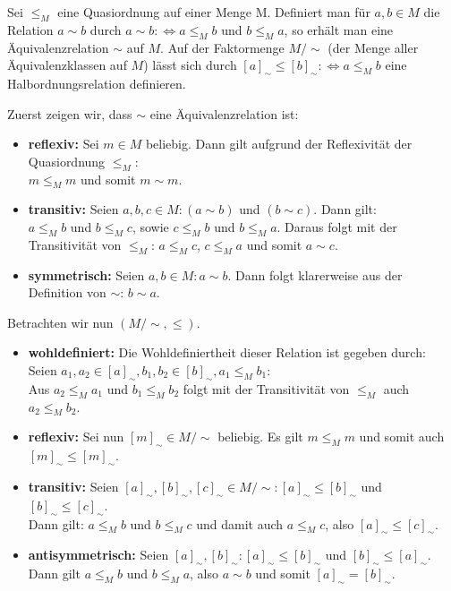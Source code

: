 \begin{exercise}
    Sei $\leq_M$ eine Quasiordnung auf einer Menge M. Definiert man für $a,b \in M$
    die Relation $a \sim b$ durch $a \sim b :\iff a \leq_M b$ und $ b \leq_M a$, so
    erhält man eine Äquivalenzrelation $\sim$ auf $M$. Auf der Faktormenge $M/\sim$
    (der Menge aller Äquivalenzklassen auf $M$) lässt sich durch $[a]_{\sim} \leq
    [b]_{\sim}: \iff a \leq_M b$ eine Halbordnungsrelation definieren.
\end{exercise}
\begin{solution}
Zuerst zeigen wir, dass $\sim$ eine Äquivalenzrelation ist: \\
\begin{itemize}
  \item \textbf{reflexiv:} Sei $m \in M$ beliebig. Dann gilt aufgrund der Reflexivität der Quasiordnung $\leq_M$: \\
  $m \leq_M m$ und somit $m \sim m$.
  \item \textbf{transitiv:} Seien $a,b,c \in M: (a \sim b)$ und $(b \sim c)$. Dann gilt: \\
  $a \leq_M b$ und $b \leq_M c$, sowie $c \leq_M b$ und $b \leq_M a$.
  Daraus folgt mit der Transitivität von $\leq_M$: $a \leq_M c$, $c \leq_M a$ und somit $a \sim c$.
  \item \textbf{symmetrisch:} Seien $a,b \in M: a \sim b$. Dann folgt klarerweise aus der Definition von $\sim$: $b \sim a$. \\
\end{itemize}
Betrachten wir nun $(M/\sim, \leq)$.
\begin{itemize}
  \item \textbf{wohldefiniert:}
  Die Wohldefiniertheit dieser Relation ist gegeben durch: \\
  Seien $a_1, a_2 \in [a]_{\sim}, b_1, b_2 \in [b]_{\sim}, a_1 \leq_M b_1$: \\
  Aus $a_2 \leq_M a_1$ und $b_1 \leq_M b_2$ folgt mit der Transitivität von $\leq_M$ auch $a_2 \leq_M b_2$.
  \item \textbf{reflexiv:} Sei nun $[m]_{\sim} \in M/\sim$ beliebig. Es gilt $m \leq_M m$ und somit auch $[m]_{\sim} \leq [m]_{\sim}$.
  \item \textbf{transitiv:} Seien $[a]_{\sim},[b]_{\sim},[c]_{\sim} \in M/\sim: [a]_{\sim} \leq [b]_{\sim}$ und
  $[b]_{\sim} \leq [c]_{\sim}$. \\
  Dann gilt: $a \leq_M b$ und $b \leq_M c$ und damit auch $a \leq_M c$, also $[a]_{\sim} \leq [c]_{\sim}$.
  \item \textbf{antisymmetrisch:} Seien $[a]_{\sim},[b]_{\sim}: [a]_{\sim} \leq [b]_{\sim}$ und $ [b]_{\sim} \leq [a]_{\sim}$. \\
  Dann gilt $a \leq_M b$ und $b \leq_M a$, also $a \sim b$ und somit $[a]_{\sim} = [b]_{\sim}$.
\end{itemize}
\end{solution}
